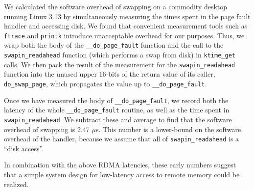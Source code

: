 We calculated the software overhead of swapping on a commodity desktop running Linux 3.13 by simultaneously measuring the times spent in the page fault handler and accessing disk. 
We found that convenient measurement tools such as \texttt{ftrace} and \texttt{printk} introduce unacceptable overhead for our purposes. 
Thus, we wrap both the body of the \texttt{\_\_do\_page\_fault} function and the call to the \texttt{swapin\_readahead} function (which performs a swap from disk) in \texttt{ktime\_get} calls.  
We then pack the result of the measurement for the \texttt{swapin\_readahead} function into the unused upper 16-bits of the return value of its caller, \texttt{do\_swap\_page}, which propagates the value up to \texttt{\_\_do\_page\_fault}. 

Once we have measured the body of \texttt{\_\_do\_page\_fault}, we record both the latency of the whole \texttt{\_\_do\_page\_fault} routine, as well as the time spent in
\texttt{swapin\_readahead}. 
We subtract these and average to find that the
software overhead of swapping is 2.47 $\mu$s. 
This number is a lower-bound on the software overhead of the handler, because we assume that all of \texttt{swapin\_readahead} is a ``disk access''.%

In combination with the above RDMA latencies, these early numbers suggest that a simple system design for low-latency access to remote memory could be realized. 


